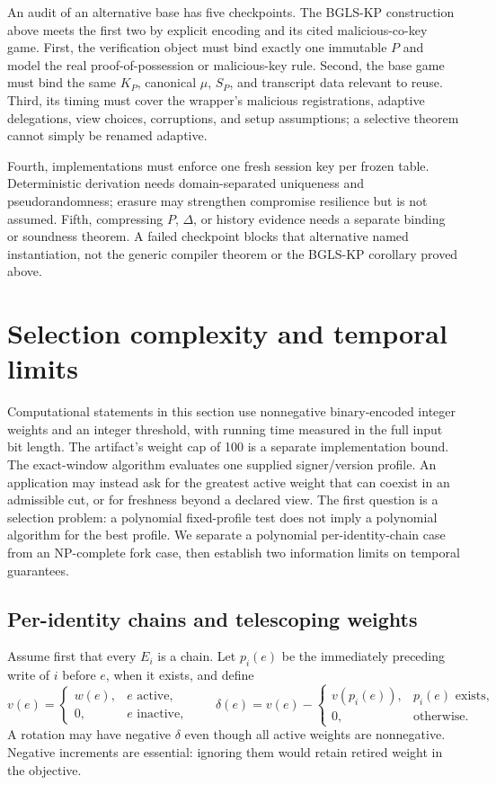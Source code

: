 \documentclass[11pt]{article}
\theoremstyle{definition}
\begin{document}
An audit of an alternative base has five checkpoints.  The BGLS-KP construction above meets the first two by explicit encoding and its cited malicious-co-key game.  First, the verification object must bind exactly one immutable $P$ and model the real proof-of-possession or malicious-key rule.  Second, the base game must bind the same $K_P$, canonical $\mu$, $S_P$, and transcript data relevant to reuse.  Third, its timing must cover the wrapper's malicious registrations, adaptive delegations, view choices, corruptions, and setup assumptions; a selective theorem cannot simply be renamed adaptive.

Fourth, implementations must enforce one fresh session key per frozen table.  Deterministic derivation needs domain-separated uniqueness and pseudorandomness; erasure may strengthen compromise resilience but is not assumed.  Fifth, compressing $P$, $\Delta$, or history evidence needs a separate binding or soundness theorem.  A failed checkpoint blocks that alternative named instantiation, not the generic compiler theorem or the BGLS-KP corollary proved above.

\section{Selection complexity and temporal limits}\label{sec:selection}\label{sec:optimization}
Computational statements in this section use nonnegative binary-encoded integer
weights and an integer threshold, with running time measured in the full input
bit length.  The artifact's weight cap of 100 is a separate implementation bound.
The exact-window algorithm evaluates one supplied signer/version profile. An application may instead ask for the greatest active weight that can coexist in an admissible cut, or for freshness beyond a declared view. The first question is a selection problem: a polynomial fixed-profile test does not imply a polynomial algorithm for the best profile. We separate a polynomial per-identity-chain case from an NP-complete fork case, then establish two information limits on temporal guarantees.

\subsection{Per-identity chains and telescoping weights}
Assume first that every $E_i$ is a chain. Let $p_i(e)$ be the immediately preceding write of $i$ before $e$, when it exists, and define
\[
 v(e)=\begin{cases}w(e),&e\text{ active},\\0,&e\text{ inactive},\end{cases}
 \qquad
 \delta(e)=v(e)-\begin{cases}v(p_i(e)),&p_i(e)\text{ exists},\\0,&\text{otherwise}.\end{cases}
\]
A rotation may have negative $\delta$ even though all active weights are nonnegative. Negative increments are essential: ignoring them would retain retired weight in the objective.
\end{document}
